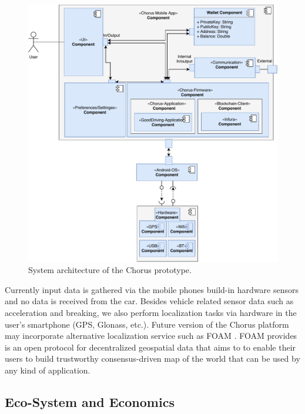 \documentclass{llncs}
\begin{document}
{			\begin{figure}[H]
				\centering
				\includegraphics[scale=0.65]{Figures/prototype-architecture/20180509_prototype-architecture-merge.pdf}
				\caption{System architecture of the Chorus prototype.}	
				\label{fig:prototype-system-architecture}
			\end{figure}
			

			Currently input data is gathered via the mobile phones build-in hardware sensors and no data is received from the car. Besides vehicle related sensor data such as acceleration and breaking, we also perform localization tasks via hardware in the user's smartphone (GPS, Glonass, etc.). Future version of the Chorus platform may incorporate alternative localization service such as FOAM \cite{foamWhitepaper}. FOAM provides is an open protocol for decentralized geospatial data that aims to to enable their users to build trustworthy consensus-driven map of the world that can be used by any kind of application.


		\subsection{Eco-System and Economics}
			\label{ss:prototype-incentives}
		
}
\end{document}
